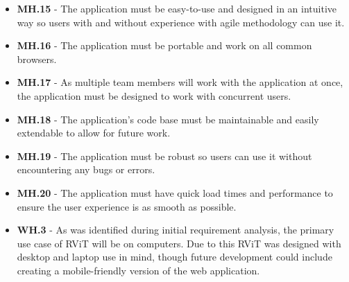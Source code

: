 \documentclass[l4proj.tex]{subfiles}
\begin{document}
\begin{itemize}
    \item \textbf{MH.15} - The application must be easy-to-use and designed in an intuitive way so users with and without experience with agile methodology can use it. 
    \item \textbf{MH.16} - The application must be portable and work on all common browsers.
    \item \textbf{MH.17} - As multiple team members will work with the application at once, the application must be designed to work with concurrent users.
    \item \textbf{MH.18} - The application's code base must be maintainable and easily extendable to allow for future work.
    \item \textbf{MH.19} - The application must be robust so users can use it without encountering any bugs or errors.
    \item \textbf{MH.20} - The application must have quick load times and performance to ensure the user experience is as smooth as possible. \\

    \item \textbf{WH.3} - As was identified during initial requirement analysis, the primary use case of RViT will be on computers. Due to this RViT was designed with desktop and laptop use in mind, though future development could include creating a mobile-friendly version of the web application.
\end{itemize}
\end{document}
